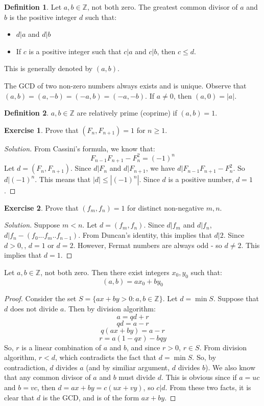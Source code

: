 \documentclass[12pt,letterpaper]{amsbook}
\theoremstyle{definition}
\newtheorem{definition}{Definition} %
\newtheorem*{exercise}{Exercise}
\newenvironment{solution}
  {\renewcommand\qedsymbol{$\blacksquare$}\begin{proof}[Solution]}
  {\end{proof}}
\newcommand{\Z}{\mathbb{Z}}
\begin{document}
\begin{definition}
  Let $a,b \in \Z$, not both zero. The greatest common divisor of $a$ and $b$ is the positive integer $d$ such that:
  \begin{itemize}
    \item $d|a$ and $d|b$
    \item If $c$ is a positive integer such that $c|a$ and $c|b$, then $c \leq d$.
  \end{itemize}
  This is generally denoted by $(a,b)$.
\end{definition}

The GCD of two non-zero numbers always exists and is unique. Observe that $(a,b) = (a,-b) = (-a,b) = (-a,-b)$. If $a \neq 0$, then $(a,0) = |a|$.

\begin{definition}
  $a,b \in \Z$ are relatively prime (coprime) if $(a,b) = 1$.
\end{definition}

\begin{exercise}
  Prove that $(F_n,F_{n+1}) = 1$ for $n \geq 1$.  
\end{exercise}
\begin{solution}
  From Cassini's formula, we know that:
  \[F_{n-1}F_{n+1} - F_n^2 = (-1)^n\]
  Let $d = (F_n,F_{n+1})$. Since $d | F_n$ and $d|F_{n+1}$, we have $d|F_{n-1}F_{n+1}-F_n^2$. So $d | (-1)^n$. This means that $|d| \leq |(-1)^n|$. Since $d$ is a positive number, $d = 1$.
\end{solution}

\begin{exercise}
  Prove that $(f_m,f_n) = 1$ for distinct non-negative $m,n$.
\end{exercise}
\begin{solution}
  Suppose $m < n$. Let $d = (f_m,f_n)$. Since $d|f_m$ and $d|f_n$, $d|f_n-(f_0...f_m..f_{n-1})$. From Duncan's identity, this implies that $d|2$. Since $d> 0, $, $d = 1$ or $d=2$. However, Fermat numbers are always odd - so $d \neq 2$. This implies that $d = 1$.
\end{solution}

\begin{theorem}
  Let $a,b \in \Z$, not both zero. Then there exist integers $x_0, y_0$ such that:
  \[(a,b) = ax_0 + by_0\]
\end{theorem}
\begin{proof}
  Consider the set $S = \{ax+by>0 : a,b \in \Z \}$. Let $d = \min S$.
  Suppose that $d$ does not divide $a$. Then by division algorithm:
  \[a=qd+r\]
  \[qd = a-r\]
  \[q(ax+by) = a-r\]
  \[r = a(1-qx)-bqy\]
  So, $r$ is a linear combination of $a$ and $b$, and since $r > 0$, $r \in S$. From division algorithm, $r < d$, which contradicts the fact that $d  = \min S$. So, by contradiction, $d$ divides $a$ (and by similiar argument, $d$ divides $b$).
  We also know that any common divisor of $a$ and $b$ must divide $d$. This is obvious since if $a = uc$ and $b = vc$, then $d = ax+by = c(ux+vy)$, so $c|d$.
  From these two facts, it is clear that $d$ is the GCD, and is of the form $ax+by$.
\end{proof}
\end{document}
